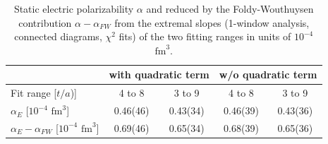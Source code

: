 \begin{table}[H]
\begin{center}
    \begin{tabular}{|l||c|c||c|c||}
    \hline	& \multicolumn{2}{c||}{with quadratic term} & \multicolumn{2}{c||}{w/o quadratic term} \\ \hline
     Fit range [$t/a$)]						& 4 to 8 	& 3 to 9 	& 4 to 8 	& 3 to 9 \\ \hline 
     $\alpha_E$ [$10^{-4}$ $\text{fm}^3$]    		& 0.46(46)	& 0.43(34) 	& 0.46(39)	& 0.43(36) \\ \hline     
     $\alpha_E-\alpha_{FW}$ [$10^{-4}$ $\text{fm}^3$]& 0.69(46) 	&  0.65(34)	& 0.68(39) 	& 0.65(36) \\ \hline
    \end{tabular}
\end{center}
\caption{Static electric polarizability  $\alpha$ and reduced by the Foldy-Wouthuysen contribution $\alpha-\alpha_{FW}$ from the extremal slopes (1-window analysis, connected diagrams, $\chi^2$ fits) of the two fitting ranges in units of $10^{-4}$ $\text{fm}^3$. }
\label{tab:1wElectricPolarizabilityConn}
\end{table}
